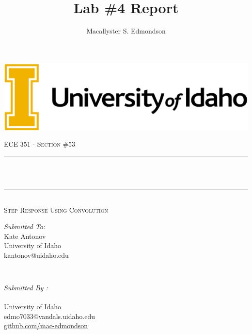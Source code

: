 \documentclass[12pt]{report}
\title{Lab \#4 Report}
\author{Macallyster S. Edmondson}
\date{\longdate\displaydate{date}}
\makeatletter
\let\thetitle\@title
\let\theauthor\@author
\makeatother
\begin{document}
\begin{titlepage}\thispagestyle{titlepage}
\centering
\includegraphics[scale = 0.12]{univ-logo.png}\\[1.0 cm]
\begin{center}    \textsc{\Large   ECE 351 - Section \#53 }\\[2.0 cm]
\end{center}%

\rule{\linewidth}{0.2 mm} \\[0.4 cm]
{ \huge \bfseries \thetitle}\\
\rule{\linewidth}{0.2 mm} \\[0.5 cm]
\textsc{\Large Step Response Using Convolution }\\[1.5 cm] %
\begin{minipage}{0.4\textwidth}
\begin{flushleft} \large
\emph{Submitted To:}\\
Kate Antonov\\ \small
University of Idaho\\
kantonov@uidaho.edu\\
\hfill
\end{flushleft}
\end{minipage}~
\begin{minipage}{0.4\textwidth}
\begin{flushright} \large
\emph{Submitted By :} \\
\theauthor \\ \small
University of Idaho\\
edmo7033@vandals.uidaho.edu\\
\href{http://github.com/mac-edmondson}{github.com/mac-edmondson}\\
\end{flushright}
\end{minipage}\\[2 cm]
\vfill
\end{titlepage}
\tableofcontents\thispagestyle{customplain}
\pagebreak
\renewcommand{\thesection}{\arabic{section}}
\end{document}
